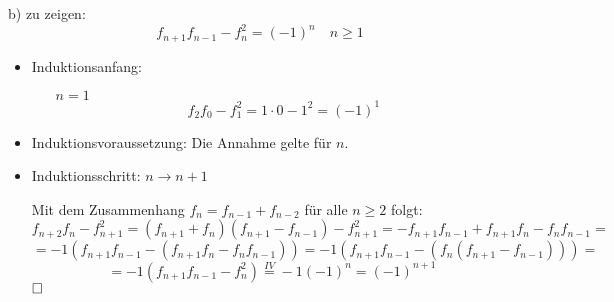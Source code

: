 \begin{paragraph}{b)}
  zu zeigen:
  \[ f_{n+1} f_{n-1} - f_n^2 = (-1)^n \quad n \geq 1 \]
  \begin{itemize}
    \item Induktionsanfang:
    \begin{itemize}
      \item[$n = 1$] \[ f_2f_0 - f_1^2 = 1 \cdot 0 - 1^2 = (-1)^1 \]
    \end{itemize}
    \item Induktionsvoraussetzung: Die Annahme gelte für $n$.
    \item Induktionsschritt: $n \rightarrow n + 1$

    Mit dem Zusammenhang $f_{n} = f_{n-1} + f_{n-2}$ für alle $n \geq 2$ folgt:
    \[ f_{n+2}f_n - f_{n+1}^2 = (f_{n+1} + f_n)(f_{n+1} - f_{n-1}) - f_{n+1}^2
                              = -f_{n+1}f_{n-1} + f_{n+1}f_n - f_nf_{n-1} = \]
    \[ = -1(f_{n+1}f_{n-1} - (f_{n+1}f_n - f_nf_{n-1})) 
       = -1(f_{n+1}f_{n-1} - (f_n(f_{n+1} - f_{n-1}))) = \]
    \[ = -1(f_{n+1}f_{n-1} - f_n^2) \overset{IV}{=} -1(-1)^n = (-1)^{n+1} \]
    $\hfill \square$
  \end{itemize}
\end{paragraph}
